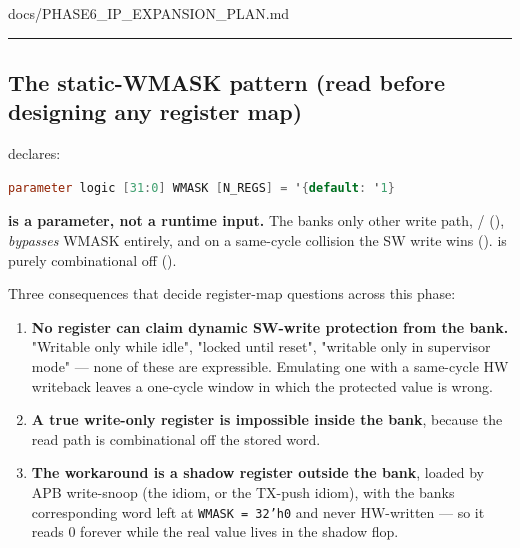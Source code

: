 \begin{relocated}{docs/PHASE6_IP_EXPANSION_PLAN.md}
\begin{center}\rule{0.5\linewidth}{0.5pt}\end{center}

\subsection{\texorpdfstring{The 
static-WMASK pattern (read before designing any register
map)}{The  static-WMASK pattern (read before designing any register map)}}\label{ds:ch:phase6-ip-expansion-plan:3-the-apb4-register-bank-static-wmask-pattern-read-before-designing-any-register-map}

 declares:

\begin{lstlisting}[language=Verilog]
parameter logic [31:0] WMASK [N_REGS] = '{default: '1}
\end{lstlisting}

\textbf{ is a parameter, not a runtime input.} The
bank\textquotesingle s only other write path,  /
 (), \emph{bypasses} WMASK entirely, and
on a same-cycle collision the SW write wins ().
 is purely combinational off 
().

Three consequences that decide register-map questions across this phase:

\begin{enumerate}
\def\labelenumi{\arabic{enumi}.}
\tightlist
\item
  \textbf{No register can claim dynamic SW-write protection from the
  bank.} "Writable only while idle", "locked until reset", "writable
  only in supervisor mode" --- none of these are expressible. Emulating
  one with a same-cycle HW writeback leaves a one-cycle window in which
  the protected value is wrong.
\item
  \textbf{A true write-only register is impossible inside the bank},
  because the read path is combinational off the stored word.
\item
  \textbf{The workaround is a shadow register outside the bank}, loaded
  by APB write-snoop (the  idiom, or
  the  TX-push idiom), with the
  bank\textquotesingle s corresponding word left at
  \texttt{WMASK\ =\allowbreak{}\ 32'h0} and never HW-written --- so it
  reads 0 forever while the real value lives in the shadow flop.
\end{enumerate}


\end{relocated}
